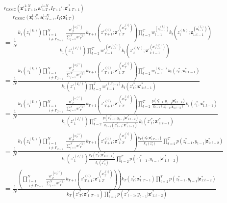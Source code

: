 \documentclass[11pt]{article}
\newcommand{\z}{\mathbf{z}}
\newcommand{\abold}{\mathbf{a}}
\begin{document}
\begin{align*}
& \frac{r_{\mathrm{CSMC}}({\z'}_{1:T+1}^{1:N}, {\abold'}_{1:T}^{1:N}, I_{T+1}'; {\z'}_{1:T+1}^*)}
{r_{\mathrm{CSMC}}(\z_{1:T}^{1:N}, \abold_{1:T-1}^{1:N}, I_T; \z_{1:T}^*)}\\
&= 
\frac{1}{N} \frac{
k_1(z_1^{(I_1)}) \displaystyle \prod_{\substack{i=1\\i \ne I'_{T+1}}}^N \frac{{w'}_{T}^{({a'}_{T}^{(i)})}}{\sum_{j=1}^N {w'}_{T}^{(j)}} k_{T+1}({z'}_{T+1}^{(i)}; {\z'}_{1:T}^{({a'}_{T}^{(i)})} )
\prod_{t=2}^{T} {w}_{t-1}^{({a}_{t-1}^{(I_t)})} k_t({z}_t^{(I_t)}; {\z}_{1:t-1}^{({a}_{t-1}^{(I_t)})} )
}{
k_1({z'}_1^{(I_1')}) \displaystyle \prod_{t=2}^{T} {w'}_{t-1}^{({a'}_{t-1}^{(I_t')})} k_t({z'}_t^{(I_t')}; {\z'}_{1:t-1}^{({a'}_{t-1}^{(I_t')})} )
}\\
&=
\frac{1}{N} \frac{
k_1(z_1^{(I_1)}) \displaystyle \prod_{\substack{i=1\\i \ne I'_{T+1}}}^N \frac{{w'}_{T}^{({a'}_{T}^{(i)})}}{\sum_{j=1}^N {w'}_{T}^{(j)}} k_{T+1}({z'}_{T+1}^{(i)}; {\z'}_{1:T}^{({a'}_{T}^{(i)})} )
\prod_{t=2}^{T} {w}_{t-1}^{(I_{t-1})} k_t({z}_t^*; {\z}_{1:t-1}^{*} )
}{
k_1({z'}_1^{(I_1')}) \displaystyle \prod_{t=2}^{T} {w'}_{t-1}^{(I'_{t-1})} k_t({z'}_t^{*}; {\z'}_{1:t-1}^{*} )
}\\
&=
\frac{1}{N} \frac{
k_1(z_1^{(I_1)}) \displaystyle \prod_{\substack{i=1\\i \ne I'_{T+1}}}^N \frac{{w'}_{T}^{({a'}_{T}^{(i)})}}{\sum_{j=1}^N {w'}_{T}^{(j)}} k_{T+1}({z'}_{T+1}^{(i)}; {\z'}_{1:T}^{({a'}_{T}^{(i)})} )
\prod_{t=2}^{T} \frac{p(z_{t-1}^*, y_{t-1} | {\z}_{1:t-2}^{*})}{k_{t-1}(z_{t-1}^{*}; \z_{1:t-2}^{*})} k_t({z}_t^*; {\z}_{1:t-1}^{*} )
}{
k_1({z'}_1^{(I_1')}) \displaystyle \prod_{t=2}^{T} \frac{p({z'}_{t-1}^*, y_{t-1} | {\z'}_{1:t-2}^*)}{k_{t-1}({z'}_{t-1}^*; {\z'}_{1:t-2}^{*})} k_t({z'}_t^{*}; {\z'}_{1:t-1}^{*} )
}\\
&=
\frac{1}{N} \frac{
k_1(z_1^{(I_1)}) \displaystyle \prod_{\substack{i=1\\i \ne I'_{T+1}}}^N \frac{{w'}_{T}^{({a'}_{T}^{(i)})}}{\sum_{j=1}^N {w'}_{T}^{(j)}} k_{T+1}({z'}_{T+1}^{(i)}; {\z'}_{1:T}^{({a'}_{T}^{(i)})} )
\frac{k_T(z_T^*; \z_{1:T-1}^*)}{k_1(z_1^*)} \prod_{t=2}^{T} p(z_{t-1}^*, y_{t-1} | {\z}_{1:t-2}^{*})
}{
k_1({z'}_1^{(I_1')}) \displaystyle \frac{k_T({z'}_T^*; {\z'}_{1:T-1}^*)}{k_1({z'}_1^*)} \prod_{t=2}^{T} p({z'}_{t-1}^*, y_{t-1} | {\z'}_{1:t-2}^*)
}\\
&=
\frac{1}{N} \frac{
\left( \displaystyle \prod_{\substack{i=1\\i \ne I'_{T+1}}}^N \frac{{w'}_{T}^{({a'}_{T}^{(i)})}}{\sum_{j=1}^N {w'}_{T}^{(j)}} k_{T+1}({z'}_{T+1}^{(i)}; {\z'}_{1:T}^{({a'}_{T}^{(i)})} ) \right)
k_T(z_T^*; \z_{1:T-1}^*)
\displaystyle \prod_{t=2}^{T} p(z_{t-1}^*, y_{t-1} | {\z}_{1:t-2}^{*})
}{
\displaystyle k_T({z'}_T^*; {\z'}_{1:T-1}^*) \prod_{t=2}^{T} p({z'}_{t-1}^*, y_{t-1} | {\z'}_{1:t-2}^*)
}
\end{align*}
\end{document}

